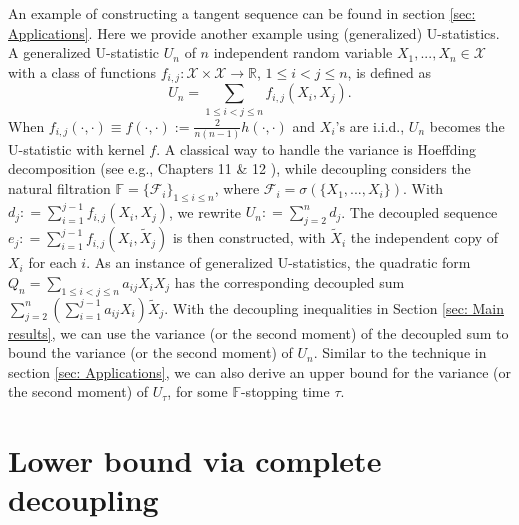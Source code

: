 \documentclass[ECP]{ejpecp} %
\newcommand{\R}{\mathbb{R}}
\newcommand{\F}{\mathcal{F}}
\newcommand{\lpar}{\left(}
\newcommand{\rpar}{\right)}
\newcommand{\tX}{\tilde{X}}
\newcommand{\X}{\mathcal{X}}
\begin{document}
An example of constructing a tangent sequence can be found in section \ref{sec: Applications}. Here we provide another example using (generalized) U-statistics. A generalized U-statistic $U_n$ of $n$ independent random variable $X_1,...,X_n \in \X$ with a class of functions $f_{i,j}: \X\times \X \rightarrow \R$, $1\leq i<j\leq n$, is defined as   
\begin{equation}
    \label{equ: generalized U stats}
    U_n= \sum\limits_{1\leq i<j\leq n}  f_{i,j}(X_i,X_j).
\end{equation}
When $f_{i,j}(\cdot,\cdot) \equiv f(\cdot,\cdot) := \frac{2}{n(n-1)} h(\cdot,\cdot)$ and $X_i$'s are i.i.d., $U_n$ becomes the U-statistic with kernel $f$. A classical way to handle the variance is Hoeffding decomposition (see e.g., Chapters 11 \& 12 \cite{MR1652247}), while decoupling considers the natural filtration $\mathbb F = \{\F_{i}\}_{1\leq i\leq n}$, where $\F_i = \sigma(\{X_1,...,X_i\})$. With $d_j : = \sum\limits_{i=1}^{j-1} f_{i,j}(X_i, X_j)$, we rewrite $U_n : = \sum\limits_{j=2}^n d_j$. The decoupled sequence $e_j: = \sum\limits_{i=1}^{j-1} f_{i,j}(X_i,\tX_j)  $ is then constructed, with $\tX_i$ the independent copy of $X_i$ for each $i$. As an instance of generalized U-statistics, the quadratic form $Q_n = \sum\limits_{1\leq i<j\leq n}  a_{ij} X_i X_j$ has the corresponding decoupled sum $\sum\limits_{j=2}^n \lpar \sum\limits_{i=1}^{j-1} a_{ij} X_i \rpar\tilde{X}_j$. With the decoupling inequalities in Section \ref{sec: Main results}, we can use the variance (or the second moment) of the decoupled sum to bound the variance (or the second moment) of $U_n$. Similar to the technique in section \ref{sec: Applications}, we can also derive an upper bound for the variance (or the second moment) of $U_\tau$, for some $\mathbb F$-stopping time $\tau$.

\section{Lower bound via complete decoupling}
\label{sec: complete decoupling}
\end{document}
